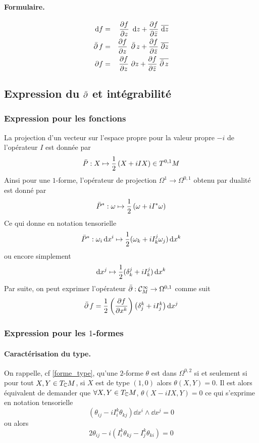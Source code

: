 \documentclass[12pt,draft]{article}
\begin{document}
\paragraph*{Formulaire.}
\begin{eqnarray*}
\dd f & = & \dpp{f}{z}\ \dd z + \dpp{f}{\bar{z}}\ \overline{\dd z} \\
\dbarre f & = & \dpp{f}{z}\ \dbarre z + \dpp{f}{\bar{z}}\ \overline{\partial z} \\
\partial f & = & \dpp{f}{z}\ \partial z + \dpp{f}{\bar{z}}\ \overline{\dbarre z}
\end{eqnarray*}

\subsection{Expression du $\operatorname{\bar{\partial}}$ et intégrabilité}
\subsubsection{Expression pour les fonctions}
La projection d'un vecteur sur l'espace propre pour la valeur propre $-i$ de l'opérateur $I$ est donnée par
\[
\bar{P} : X \mapsto \operatorname{\frac{1}{2}}\left(X + iIX\right) \in T^{0,1}M
\]
Ainsi pour une $1$-forme, l'opérateur de projection $\Omega^1 \rightarrow \Omega^{0,1}$ obtenu par dualité est donné par
\[
\bar{P}^* : \omega \mapsto \operatorname{\frac{1}{2}}\left(\omega + i I^* \omega\right)
\]
Ce qui donne en notation tensorielle
\[
\bar{P}^* : \omega_i \operatorname{d\!} x^i \mapsto \operatorname{\frac{1}{2}}(\omega_k +i I^j_k \omega_j)\operatorname{d\!} x^k
\]
ou encore simplement
\begin{equation}
\operatorname{d\!} x^j  \mapsto \operatorname{\frac{1}{2}}(\delta^j_k + i I ^j_k) \operatorname{d\!} x^k
\end{equation}
Par suite, on peut exprimer l'opérateur $\operatorname{\bar{\partial}} : \mathcal{C}^\infty_M \rightarrow \Omega^{0,1}$ comme suit
\begin{equation}
\operatorname{\bar{\partial}} f = \operatorname{\frac{1}{2}} \left(
\dfrac{\partial{f}}{\partial{x^k}}
\right)\left(\delta^k_j + i I^k_j\right) \operatorname{d\!} x^j
\end{equation}
\subsubsection{Expression pour les $1$-formes}
\paragraph*{Caractérisation du type.}
On rappelle, cf {\autoref{forme_type}}, qu'une $2$-forme $\theta$ est dans $\Omega^{0,2}$ si et seulement si pour tout $X,Y \in T_{\mathbb{C}} M$, si $X$ est de type $(1,0)$ alors $\theta(X,Y) = 0$. Il est alors équivalent de demander que $\forall X,Y \in T_{\mathbb{C}} M$, $\theta(X-iIX,Y) = 0$ ce qui s'exprime en notation tensorielle
\[
\left(\theta_{ij} - i I_i^k\theta_{kj}\right)\dd x^i \wedge \dd x^j = 0
\]
ou alors
\[
2\theta_{ij} - i( I_i^k \theta_{kj} - I_j^k \theta_{ki} ) = 0
\]
\end{document}
